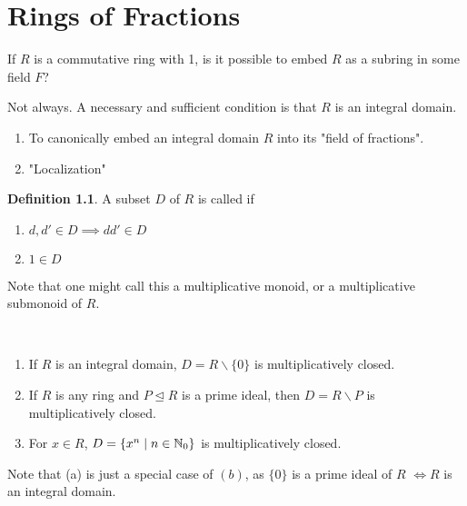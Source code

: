 \documentclass[11pt]{book}
\theoremstyle{definition}   \newtheorem{defn}[counter]{Definition} %
\newcommand{\bs}{\backslash}   \newcommand{\A}{\mathcal{A}}   \newcommand{\sy}{\textnormal{Syl}}   \newcommand{\size}[1]{\left| #1 \right|}
\newcommand{\nsg}{\mathrel{\unlhd}}   \newcommand{\ind}{\parindent24pt}   \newcommand{\vn}{\varnothing}
\newcommand{\vs}{\vspace{8pt}}
\numberwithin{counter}{chapter}
\begin{document}
\chapter{ \null Rings of Fractions}


 If $R$ is a commutative ring with 1, is it possible to embed $R$ as a subring in some field $F$?

 Not always. A necessary and sufficient condition is that $R$ is an integral domain.

\vs

\begin{enumerate}
\item[(1)] To canonically embed an integral domain $R$ into its "field of fractions".
\item[(2)] "Localization"
\end{enumerate}

\vs

\begin{defn}
A subset $D$ of $R$ is called  if
\begin{enumerate}
\item[(a)\ \ ] $d,d' \in D \implies dd' \in D$
\item[(b)*] $1 \in D$
\end{enumerate}
\end{defn}

Note that one might call this a multiplicative monoid, or a multiplicative submonoid of $R$.

\vs

\begin{example*}
\
\begin{enumerate}
\item[(a)] If $R$ is an integral domain, $D = R \bs \{0\}$ is multiplicatively closed.
\item[(b)] If $R$ is any ring and $P \nsg R$ is a prime ideal, then $D = R \bs P$ is multiplicatively closed.
\item[(c)] For $x \in R$, $D = \{x^n \mid n \in \operatorname{\mathbb{N}}_0\}$ is multiplicatively closed.
\end{enumerate}
\end{example*}

Note that (a) is just a special case of $(b)$, as $\{0\}$ is a prime ideal of $R$ $\iff R$ is an integral domain.
\end{document}
